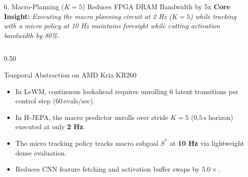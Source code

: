 \documentclass[aspectratio=169, 10pt]{beamer}
\begin{document}
\begin{frame}{6. Macro-Planning ($K=5$) Reduces FPGA DRAM Bandwidth by 5x}
  \textbf{Core Insight:} \textit{Executing the macro planning circuit at 2 Hz ($K=5$) while tracking with a micro policy at 10 Hz maintains foresight while cutting activation bandwidth by 80\%.}

  \vspace{0.2cm}
  \begin{columns}[T]
    \begin{column}{0.50\textwidth}
      \begin{block}{Temporal Abstraction on AMD Kria KR260}
        \small
        \begin{itemize}
          \item In LeWM, continuous lookahead requires unrolling 6 latent transitions per control step ($60\,\mathrm{evals/sec}$).
          \item In H-JEPA, the macro predictor unrolls over stride $K=5$ ($0.5\,\mathrm{s}$ horizon) executed at only \textbf{2 Hz}.
          \item The micro tracking policy tracks macro subgoal $S^*$ at \textbf{10 Hz} via lightweight dense evaluation.
          \item Reduces CNN feature fetching and activation buffer swaps by \textbf{$5.0\times$}.
        \end{itemize}
      \end{block}
    \end{column}


\end{columns}
\end{frame}
\end{document}
